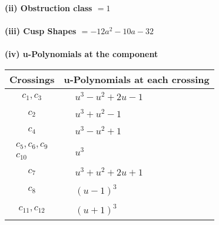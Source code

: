\documentclass[1p]{elsarticle_modified}
\theoremstyle{definition}
\begin{document}
\flushleft \textbf{(ii) Obstruction class $= 1$}\\~\\
\flushleft \textbf{(iii) Cusp Shapes $= -12 a^2-10 a-32$}\\~\\
\newpage\renewcommand{\arraystretch}{1}
\flushleft \textbf{(iv) u-Polynomials at the component}\newline \\
\begin{tabular}{m{50pt}|m{274pt}}
Crossings & \hspace{64pt}u-Polynomials at each crossing \\
\hline $$\begin{aligned}c_{1},c_{3}\end{aligned}$$&$\begin{aligned}
&u^3- u^2+2 u-1
\end{aligned}$\\
\hline $$\begin{aligned}c_{2}\end{aligned}$$&$\begin{aligned}
&u^3+u^2-1
\end{aligned}$\\
\hline $$\begin{aligned}c_{4}\end{aligned}$$&$\begin{aligned}
&u^3- u^2+1
\end{aligned}$\\
\hline $$\begin{aligned}c_{5},c_{6},c_{9}\\c_{10}\end{aligned}$$&$\begin{aligned}
&u^3
\end{aligned}$\\
\hline $$\begin{aligned}c_{7}\end{aligned}$$&$\begin{aligned}
&u^3+u^2+2 u+1
\end{aligned}$\\
\hline $$\begin{aligned}c_{8}\end{aligned}$$&$\begin{aligned}
&(u-1)^3
\end{aligned}$\\
\hline $$\begin{aligned}c_{11},c_{12}\end{aligned}$$&$\begin{aligned}
&(u+1)^3
\end{aligned}$\\
\hline
\end{tabular}\\~\\
\end{document}

